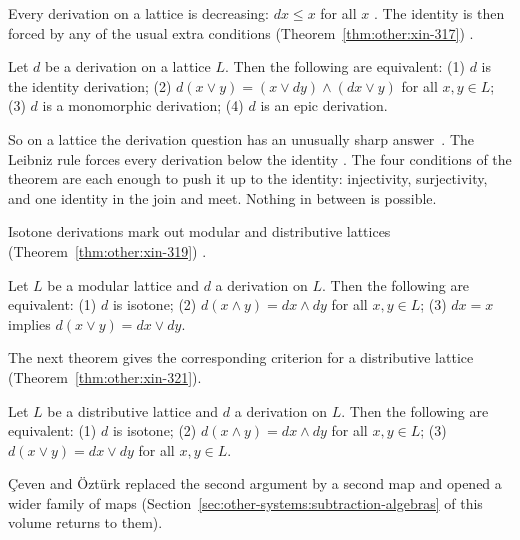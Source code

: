 Every derivation on a lattice is decreasing: $dx \le x$ for all $x$
\cite[Proposition~3.6, p.~310]{XinLiLu2008}. The identity is then forced
by any of the usual extra conditions (Theorem~\ref{thm:other:xin-317})
\cite[Theorem~3.17, p.~312]{XinLiLu2008}.\begin{theorem}\label{thm:other:xin-317}
Let $d$ be a derivation on a lattice $L$. Then the following are
equivalent: \textup{(1)} $d$ is the identity derivation; \textup{(2)}
$d(x \vee y) = (x \vee dy) \wedge (dx \vee y)$ for all $x, y \in L$;
\textup{(3)} $d$ is a monomorphic derivation; \textup{(4)} $d$ is an epic
derivation.
\end{theorem}

So on a lattice the derivation question has an unusually sharp answer~\cite[Proposition~3.6, p.~310]{XinLiLu2008}. The
Leibniz rule forces every derivation below the identity
\cite[Proposition~3.6, p.~310]{XinLiLu2008}. The four conditions of the
theorem are each enough to push it up to the identity: injectivity,
surjectivity, and one identity in the join and meet. Nothing in between is
possible.

Isotone derivations mark out modular and distributive lattices (Theorem~\ref{thm:other:xin-319})
\cite[Theorem~3.19, p.~313]{XinLiLu2008}.\begin{theorem}\label{thm:other:xin-319}
Let $L$ be a modular lattice and $d$ a derivation on $L$. Then the
following are equivalent: \textup{(1)} $d$ is isotone; \textup{(2)}
$d(x \wedge y) = dx \wedge dy$ for all $x, y \in L$; \textup{(3)}
$dx = x$ implies $d(x \vee y) = dx \vee dy$.
\end{theorem}

The next theorem gives the corresponding criterion for a distributive lattice
(Theorem~\ref{thm:other:xin-321}).

\begin{theorem}\label{thm:other:xin-321}
Let $L$ be a distributive lattice and $d$ a derivation on $L$. Then the
following are equivalent: \textup{(1)} $d$ is isotone; \textup{(2)}
$d(x \wedge y) = dx \wedge dy$ for all $x, y \in L$; \textup{(3)}
$d(x \vee y) = dx \vee dy$ for all $x, y \in L$.
\end{theorem}

{\c{C}}even and {\"O}zt{\"u}rk replaced the second argument by a second map
and opened a wider family of maps
(Section~\ref{sec:other-systems:subtraction-algebras} of this volume returns
to them).

